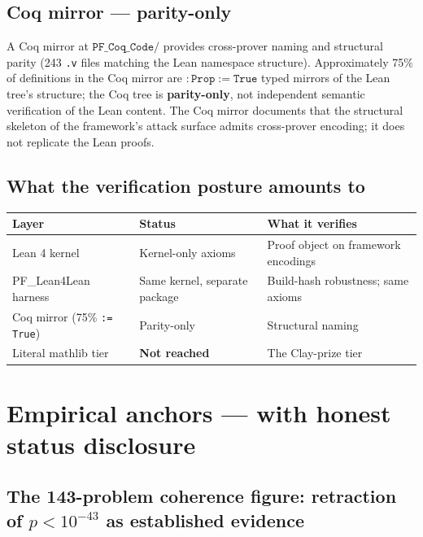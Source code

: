 \documentclass[11pt,a4paper]{article}
\theoremstyle{plain}
\theoremstyle{definition}
\begin{document}
\subsection{Coq mirror --- parity-only}
\label{sec:coq-mirror}

A Coq mirror at $\mathtt{PF\_Coq\_Code/}$ provides cross-prover
naming and structural parity (243 \texttt{.v} files matching the
Lean namespace structure). Approximately 75\% of definitions in
the Coq mirror are $\mathtt{: Prop := True}$ typed mirrors of the
Lean tree's structure; the Coq tree is \textbf{parity-only}, not
independent semantic verification of the Lean content. The Coq
mirror documents that the structural skeleton of the framework's
attack surface admits cross-prover encoding; it does not replicate
the Lean proofs.

\subsection{What the verification posture amounts to}
\label{sec:verification-summary}

\begin{center}
\renewcommand{\arraystretch}{1.20}
\begin{tabular}{lll}
\toprule
\textbf{Layer} & \textbf{Status} & \textbf{What it verifies} \\
\midrule
Lean 4 kernel & Kernel-only axioms & Proof object on framework
  encodings \\
PF\_Lean4Lean harness & Same kernel, separate package &
  Build-hash robustness; same axioms \\
Coq mirror (75\% \texttt{:= True}) & Parity-only &
  Structural naming \\
Literal mathlib tier & \textbf{Not reached} & The Clay-prize
  tier \\
\bottomrule
\end{tabular}
\end{center}

\section{Empirical anchors --- with honest status disclosure}
\label{sec:empirical}

\subsection{The 143-problem coherence figure: retraction of
$p < 10^{-43}$ as established evidence}
\label{sec:143}
\end{document}
